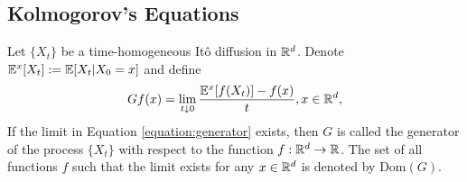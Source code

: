 

\subsection{Kolmogorov's Equations}

\begin{definition}
  Let $\{X_t\}$ be a time-homogeneous Itô diffusion in $\mathbb{R}^d$. Denote $\mathbb{E}^x[X_t] := \mathbb{E}[X_t|X_0=x]$ and define
  \begin{equation}
    \label{equation:generator}
    Gf(x) = \lim\limits_{t\downarrow 0}\dfrac{\mathbb{E}^x[f(X_t)]- f(x)}{t}, x\in\mathbb{R}^d,
  \end{equation}
  If the limit in Equation \ref{equation:generator} exists, then $G$ is called the generator of the process $\{X_t\}$ with respect to the function $f:\mathbb{R}^d\to \mathbb{R}$. The set of all functions $f$ such that the limit exists for any $x\in\mathbb{R}^d$ is denoted by $\mathrm{Dom}(G)$.
\end{definition}

